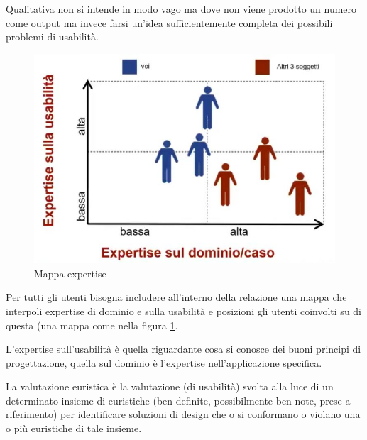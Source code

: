 \documentclass[11pt,a4paper]{book}
\begin{document}
Qualitativa non si intende in modo vago ma dove non viene prodotto un numero come output ma invece farsi un'idea sufficientemente completa dei possibili problemi di usabilità.

\begin{figure}[h!]
	\begin{center}
		\includegraphics[scale=0.6]{img/012.jpg}
		\caption{Mappa expertise}
		\label{fig: 012}
	\end{center}
\end{figure}
Per tutti gli utenti bisogna includere all'interno della relazione una mappa che interpoli expertise di dominio e sulla usabilità e posizioni gli utenti coinvolti su di questa (una mappa come nella figura \ref{fig: 012}.

L'expertise sull'usabilità è quella riguardante cosa si conosce dei buoni principi di progettazione, quella sul dominio è l'expertise nell'applicazione specifica.

La valutazione euristica è la valutazione (di usabilità) svolta alla luce di un determinato insieme di euristiche (ben definite, possibilmente ben note, prese a riferimento) per identificare soluzioni di design che o si conformano o violano una o più euristiche di tale insieme.
\end{document}
